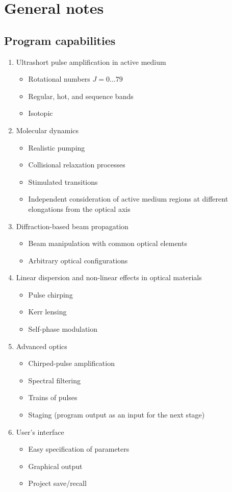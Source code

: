 \chapter{General notes}

\section{Program capabilities}
\begin{enumerate}
    \item Ultrashort pulse amplification in  active medium
    \begin{itemize}
        \item Rotational numbers \( J = 0...79 \)
        \item Regular, hot, and sequence bands
        \item Isotopic 
    \end{itemize}
    \item Molecular dynamics
    \begin{itemize}
        \item Realistic pumping
        \item Collisional relaxation processes
        \item Stimulated transitions
        \item Independent consideration of active medium regions at different elongations from the optical axis
    \end{itemize}
    \item Diffraction-based beam propagation
    \begin{itemize}
        \item Beam manipulation with common optical elements
        \item Arbitrary optical configurations
    \end{itemize}
    \item Linear dispersion and non-linear effects in optical materials
    \begin{itemize}
        \item Pulse chirping
        \item Kerr lensing
        \item Self-phase modulation
    \end{itemize}
    \item Advanced optics
    \begin{itemize}
        \item Chirped-pulse amplification
        \item Spectral filtering
        \item Trains of pulses
        \item Staging (program output as an input for the next stage)
    \end{itemize}
    \item User's interface
    \begin{itemize}
        \item Easy specification of parameters
        \item Graphical output
        \item Project save/recall
    \end{itemize}
\end{enumerate}



